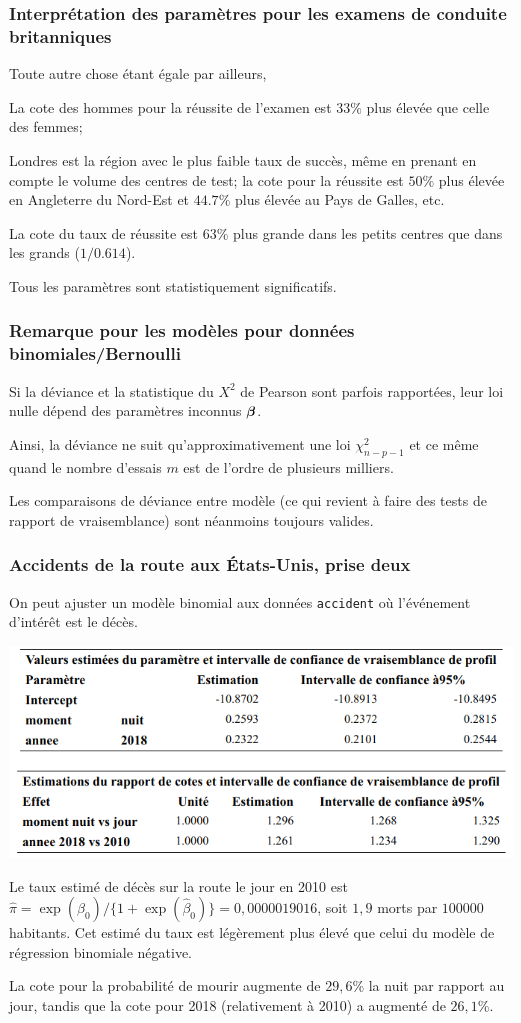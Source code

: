 \documentclass{beamer}
\begin{document}
\begin{frame}
 \frametitle{Interprétation des paramètres pour les examens de conduite britanniques}
 Toute autre chose étant égale par ailleurs,
 \bi \item La cote des hommes pour la réussite de l'examen est $33\%$ plus élevée que celle des femmes;
 \item Londres est la région avec le plus faible taux de succès, même en prenant en compte le volume des centres de test; la cote pour la réussite est $50\%$ plus élevée en Angleterre du Nord-Est et $44.7\%$ plus élevée au Pays de Galles, etc.
  \item La cote du taux de réussite est $63\%$ plus grande dans les petits centres que dans les grands ($1/0.614$).
  \item Tous les paramètres sont statistiquement significatifs.
 \ei 
\end{frame}


\begin{frame}
 \frametitle{Remarque pour les modèles pour données binomiales/Bernoulli}
 \bi \item Si la déviance et la statistique du $X^2$ de Pearson sont parfois rapportées, leur loi nulle dépend des paramètres inconnus $\boldsymbol {\beta}$.
 \item Ainsi, la déviance ne suit qu'approximativement une loi $\chi^2_{n-p-1}$ et ce même quand le nombre d'essais $m$ est de l'ordre de plusieurs milliers.
 \item Les comparaisons de déviance entre modèle (ce qui revient à faire des tests de rapport de vraisemblance) sont néanmoins toujours valides.
  \ei
\end{frame}

\begin{frame}
 \frametitle{Accidents de la route aux États-Unis, prise deux}
 On peut ajuster un modèle binomial aux données \texttt{accident} où l'événement d'intérêt est le décès.
 
 \begin{center}
  \includegraphics[width = 0.7\linewidth]{img/c4/diapos8-e24}
 \end{center}
 {\small
\bi \item Le taux estimé de décès sur la route le jour en 2010 est
$\hat{\pi}=\exp(\hat{\beta}_0)/\{1+\exp(\hat{\beta}_0)\} = 0,0000019016$, soit $1,9$ morts par $100 000$ habitants. Cet estimé du taux est légèrement plus élevé que celui du modèle de régression binomiale négative.
\item La cote pour la probabilité de mourir augmente  de $29,6$\% la nuit par rapport au jour, tandis que la cote pour 2018 (relativement à 2010) a augmenté de $26,1$\%.
\ei
}
\end{frame}
\end{document}
